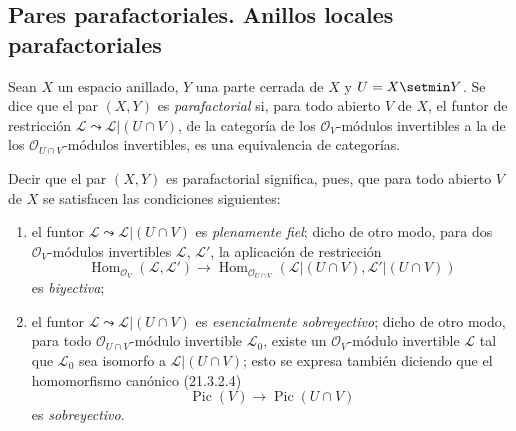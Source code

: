\subsection{Pares parafactoriales. Anillos locales parafactoriales}
\label{subsection:IV.21.13}
\label{IV.21.13}

\begin{definition}[21.13.1]
\label{IV.21.13.1}
Sean $X$ un espacio anillado, $Y$ una parte cerrada de $X$ y $U=X\setmin Y$.
Se dice que el par $(X,Y)$ es \emph{parafactorial} si, para todo abierto $V$ de $X$,
el funtor de restricción
$\mathscr L\leadsto\mathscr L|(U\cap V)$, de la categoría de los
$\mathcal O_V$-módulos invertibles a la de los $\mathcal O_{U\cap V}$-módulos
invertibles, es una equivalencia de categorías.
\end{definition}

Decir que el par $(X,Y)$ es parafactorial significa, pues, que para todo abierto $V$
de $X$ se satisfacen las condiciones siguientes:
\begin{enumerate}[label=\arabic*\textsuperscript{o}]
  \item el funtor $\mathscr L\leadsto\mathscr L|(U\cap V)$ es \emph{plenamente
  fiel}; dicho de otro modo, para dos $\mathcal O_V$-módulos invertibles $\mathscr L$,
  $\mathscr L'$, la aplicación de restricción
  \[
    \operatorname{Hom}_{\mathcal O_V}(\mathscr L,\mathscr L')
    \longrightarrow
    \operatorname{Hom}_{\mathcal O_{U\cap V}}
    (\mathscr L|(U\cap V),\mathscr L'|(U\cap V))
  \]
  es \emph{biyectiva};
  \item el funtor $\mathscr L\leadsto\mathscr L|(U\cap V)$ es
  \emph{esencialmente sobreyectivo}; dicho de otro modo, para todo
  $\mathcal O_{U\cap V}$-módulo invertible $\mathscr L_0$, existe un
  $\mathcal O_V$-módulo invertible $\mathscr L$ tal que $\mathscr L_0$ sea
  isomorfo a $\mathscr L|(U\cap V)$; esto se expresa también diciendo que
  el homomorfismo canónico (21.3.2.4)
  \[
    \operatorname{Pic}(V)\longrightarrow\operatorname{Pic}(U\cap V)
  \]
  es \emph{sobreyectivo}.
\end{enumerate}

